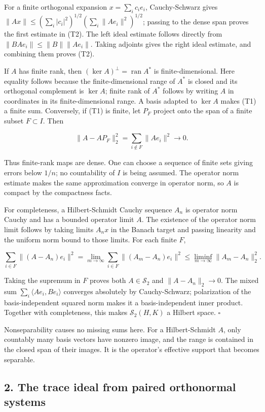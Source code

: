 \documentclass[
  11pt,
]{article}
\begin{document}
For a finite orthogonal expansion \(x=\sum_i c_ie_i\), Cauchy-Schwarz
gives \(\|Ax\|\leq(\sum_i|c_i|^2)^{1/2}(\sum_i\|Ae_i\|^2)^{1/2}\);
passing to the dense span proves the first estimate in (T2). The left
ideal estimate follows directly from \(\|BAe_i\|\leq\|B\|\|Ae_i\|\).
Taking adjoints gives the right ideal estimate, and combining them
proves (T2).

If \(A\) has finite rank, then \((\ker A)^\perp=\operatorname{ran}A^*\)
is finite-dimensional. Here equality follows because the
finite-dimensional range of \(A^*\) is closed and its orthogonal
complement is \(\ker A\); finite rank of \(A^*\) follows by writing
\(A\) in coordinates in its finite-dimensional range. A basis adapted to
\(\ker A\) makes (T1) a finite sum. Conversely, if (T1) is finite, let
\(P_F\) project onto the span of a finite subset \(F\subset I\). Then

\[
\|A-AP_F\|_2^2=\sum_{i\notin F}\|Ae_i\|^2\longrightarrow0.    \tag{T4}
\]

Thus finite-rank maps are dense. One can choose a sequence of finite
sets giving errors below \(1/n\); no countability of \(I\) is being
assumed. The operator norm estimate makes the same approximation
converge in operator norm, so \(A\) is compact by the compactness facts.

For completeness, a Hilbert-Schmidt Cauchy sequence \(A_n\) is operator
norm Cauchy and has a bounded operator limit \(A\). The existence of the
operator norm limit follows by taking limits \(A_nx\) in the Banach
target and passing linearity and the uniform norm bound to those limits.
For each finite \(F\),

\[
\sum_{i\in F}\|(A-A_n)e_i\|^2
=\lim_{m\to\infty}\sum_{i\in F}\|(A_m-A_n)e_i\|^2
\leq\liminf_{m\to\infty}\|A_m-A_n\|_2^2.
\]

Taking the supremum in \(F\) proves both \(A\in\mathcal S_2\) and
\(\|A-A_n\|_2\to0\). The mixed sum \(\sum_i\langle Ae_i,Be_i\rangle\)
converges absolutely by Cauchy-Schwarz; polarization of the
basis-independent squared norm makes it a basis-independent inner
product. Together with completeness, this makes \(\mathcal S_2(H,K)\) a
Hilbert space. \(\square\)

Nonseparability causes no missing sums here. For a Hilbert-Schmidt
\(A\), only countably many basis vectors have nonzero image, and the
range is contained in the closed span of their images. It is the
operator's effective support that becomes separable.

\subsection{2. The trace ideal from paired orthonormal
systems}\label{the-trace-ideal-from-paired-orthonormal-systems}
\end{document}
